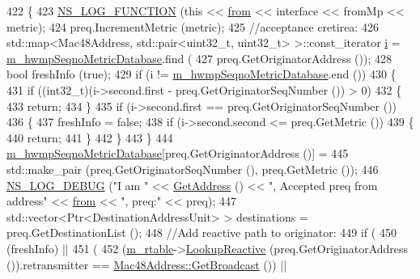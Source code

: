 \begin{DoxyCode}
422 \{
423   \hyperlink{log-macros-disabled_8h_a90b90d5bad1f39cb1b64923ea94c0761}{NS\_LOG\_FUNCTION} (\textcolor{keyword}{this} << \hyperlink{lte__amc_8m_a1b4c81ff74eb1a626b5ade44c81004b3}{from} << interface << fromMp << metric);
424   preq.IncrementMetric (metric);
425   \textcolor{comment}{//acceptance cretirea:}
426   std::map<Mac48Address, std::pair<uint32\_t, uint32\_t> >::const\_iterator \hyperlink{bernuolliDistribution_8m_a6f6ccfcf58b31cb6412107d9d5281426}{i} = 
      \hyperlink{classns3_1_1dot11s_1_1HwmpProtocol_afcff65dd692f7524ea04f46d2cfc7990}{m\_hwmpSeqnoMetricDatabase}.find (
427       preq.GetOriginatorAddress ());
428   \textcolor{keywordtype}{bool} freshInfo (\textcolor{keyword}{true});
429   \textcolor{keywordflow}{if} (i != \hyperlink{classns3_1_1dot11s_1_1HwmpProtocol_afcff65dd692f7524ea04f46d2cfc7990}{m\_hwmpSeqnoMetricDatabase}.end ())
430     \{
431       \textcolor{keywordflow}{if} ((int32\_t)(i->second.first - preq.GetOriginatorSeqNumber ())  > 0)
432         \{
433           \textcolor{keywordflow}{return};
434         \}
435       \textcolor{keywordflow}{if} (i->second.first == preq.GetOriginatorSeqNumber ())
436         \{
437           freshInfo = \textcolor{keyword}{false};
438           \textcolor{keywordflow}{if} (i->second.second <= preq.GetMetric ())
439             \{
440               \textcolor{keywordflow}{return};
441             \}
442         \}
443     \}
444   \hyperlink{classns3_1_1dot11s_1_1HwmpProtocol_afcff65dd692f7524ea04f46d2cfc7990}{m\_hwmpSeqnoMetricDatabase}[preq.GetOriginatorAddress ()] =
445     std::make\_pair (preq.GetOriginatorSeqNumber (), preq.GetMetric ());
446   \hyperlink{group__logging_ga413f1886406d49f59a6a0a89b77b4d0a}{NS\_LOG\_DEBUG} (\textcolor{stringliteral}{"I am "} << \hyperlink{classns3_1_1dot11s_1_1HwmpProtocol_ab8b2c6d98ae278406f543e25feca8ccc}{GetAddress} () << \textcolor{stringliteral}{", Accepted preq from address"} << 
      \hyperlink{lte__amc_8m_a1b4c81ff74eb1a626b5ade44c81004b3}{from} << \textcolor{stringliteral}{", preq:"} << preq);
447   std::vector<Ptr<DestinationAddressUnit> > destinations = preq.GetDestinationList ();
448   \textcolor{comment}{//Add reactive path to originator:}
449   \textcolor{keywordflow}{if} (
450     (freshInfo) ||
451     (
452       (\hyperlink{classns3_1_1dot11s_1_1HwmpProtocol_a12fda0e3e5a400888c8ba1a87c1a7216}{m\_rtable}->\hyperlink{classns3_1_1dot11s_1_1HwmpRtable_a41a44ed94c1ed4d798f3278ba8db0f1f}{LookupReactive} (preq.GetOriginatorAddress ()).retransmitter == 
      \hyperlink{classns3_1_1Mac48Address_a55156e302c6bf950c0b558365adbde84}{Mac48Address::GetBroadcast} ()) ||

\end{DoxyCode}
